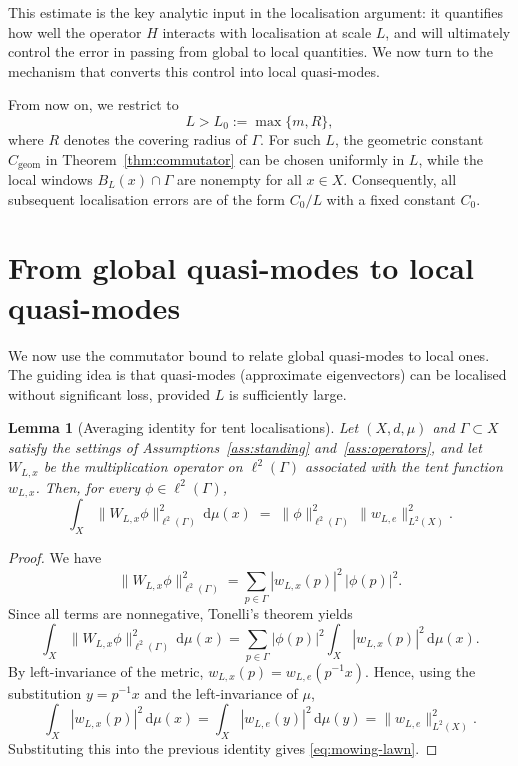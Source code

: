 \documentclass[11pt]{article}
\newtheorem{lemma}[theorem]{Lemma}
\theoremstyle{definition}
\begin{document}
This estimate is the key analytic input in the localisation argument: it
quantifies how well the operator $H$ interacts with localisation at scale $L$,
and will ultimately control the error in passing from global to local
quantities. We now turn to the mechanism that converts this control into
local quasi-modes.

From now on, we restrict to
\[
    L > L_0:=\max\{m,R\},
\]
where $R$ denotes the covering radius of $\Gamma$. For such $L$, the
geometric constant $C_{\mathrm{geom}}$ in Theorem~\ref{thm:commutator}
can be chosen uniformly in $L$, while the
local windows $B_L(x)\cap\Gamma$ are nonempty for all $x\in X$. Consequently,
all subsequent localisation errors are of the form $C_0/L$ with a fixed
constant $C_0$.

\section{From global quasi-modes to local quasi-modes}

We now use the commutator bound to relate global quasi-modes to local ones.
The guiding idea is that quasi-modes (approximate eigenvectors) can be localised without
significant loss, provided $L$ is sufficiently large.

\begin{lemma}[Averaging identity for tent localisations]\label{lem:avg-W}
Let $(X,d,\mu)$ and $\Gamma \subset X$ satisfy the settings of Assumptions~\ref{ass:standing}
and~\ref{ass:operators}, and let $W_{L,x}$ be the multiplication operator on $\ell^2(\Gamma)$
associated with the tent function $w_{L,x}$.
Then, for every $\phi\in\ell^2(\Gamma)$,
\begin{equation}\label{eq:mowing-lawn}
 \int_X \bigl\|W_{L,x}\phi\bigr\|_{\ell^2(\Gamma)}^2\,\mathrm{d}\mu(x)
 \;=\;
 \|\phi\|_{\ell^2(\Gamma)}^2\,\|w_{L,e}\|_{L^2(X)}^2 .
\end{equation}
\end{lemma}

\begin{proof}
We have
\[
 \|W_{L,x}\phi\|_{\ell^2(\Gamma)}^2
 = \sum_{p\in\Gamma} |w_{L,x}(p)|^2\,|\phi(p)|^2.
\]
Since all terms are nonnegative, Tonelli's theorem yields
\[
 \int_{X}\|W_{L,x}\phi\|_{\ell^2(\Gamma)}^2\,\mathrm{d}\mu(x)
 = \sum_{p\in\Gamma}|\phi(p)|^2
   \int_{X}|w_{L,x}(p)|^2\,\mathrm{d}\mu(x).
\]
By left-invariance of the metric,
$ w_{L,x}(p)=w_{L,e}(p^{-1}x). $
Hence, using the substitution $y=p^{-1}x$ and the left-invariance of $\mu$,
\[
  \int_X |w_{L,x}(p)|^2\,\mathrm{d}\mu(x)
  =
  \int_X |w_{L,e}(y)|^2\,\mathrm{d}\mu(y)
  =
  \|w_{L,e}\|_{L^2(X)}^2.
\] Substituting this into the previous identity gives
\eqref{eq:mowing-lawn}.
\end{proof}
\end{document}
